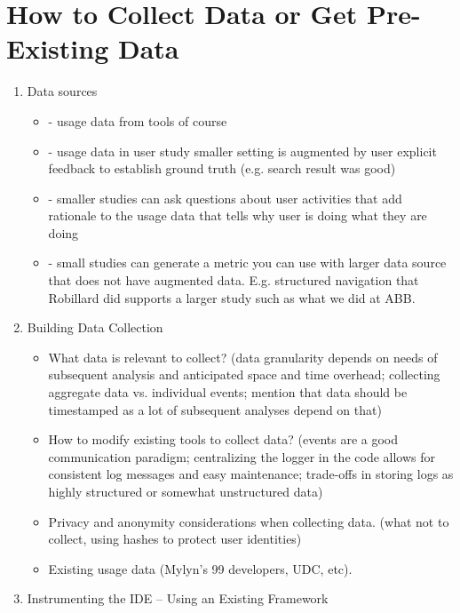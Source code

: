 \section{How to Collect Data or Get Pre-Existing Data}


  \begin{enumerate}
  \item Data sources
    \begin{itemize}
    \item
	- usage data from tools of course
\item
	- usage data in user study smaller setting is augmented by user explicit feedback to establish ground truth (e.g. search result was good) 
\item
	- smaller studies can ask questions about user activities that add rationale to the usage data that tells why user is doing what they are doing
\item 
	- small studies can generate a metric you can use with larger data source that does not have augmented data.  E.g. structured navigation that Robillard did supports a larger study such as what we did at ABB.
    \end{itemize}

  \item Building Data Collection %
  
    \begin{itemize}
    \item
      What data is relevant to collect? (data granularity depends on needs of subsequent analysis and anticipated space and time overhead; collecting aggregate data vs. individual events; mention that data should be timestamped as a lot of subsequent analyses depend on that)
    \item
      How to modify existing tools to collect data? (events are a good communication paradigm; centralizing the logger in the code allows for consistent log messages and easy maintenance; trade-offs in storing logs as highly structured or somewhat unstructured data)
    \item
      Privacy and anonymity considerations when collecting data. (what not to collect, using hashes to protect user identities)
      
     
    \item
    	Existing usage data (Mylyn's 99 developers, UDC, etc). %
     
    \end{itemize}

  \item Instrumenting the IDE -- Using an Existing Framework %
  

\end{enumerate}
